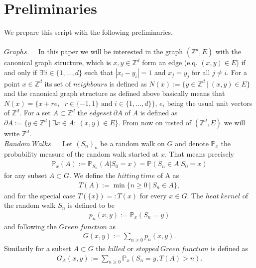 \documentclass[12pt,a4paper]{scrartcl}
\numberwithin{equation}{section}
\numberwithin{equation}{section}%
\theoremstyle{definition}
\theoremstyle{definition}
\begin{document}
\newpage


\section{Preliminaries} \label{prelim}

We prepare this script with the following preliminaries. \\
\\
$\boldsymbol{\mathit{Graphs}}.\quad$ In this paper we will be interested in the graph $(\mathbb{Z}^d, E)$ with the canonical graph structure, which is $x,y\in \mathbb{Z}^d$ form an edge (e.q. $(x,y)\in E$) if and only if $\exists ! i\in \{1,\dots, d\}$ such that $|x_i - y_i| = 1$ and $x_j = y_j$ for all $j\neq i$. For a point $x\in \mathbb{Z}^d$ its set of $\mathit{neighbours}$ is defined as $N(x) := \{y\in \mathbb{Z}^d\ |\ (x,y)\in E\}$ and the canonical graph structure as defined above basically means that $N(x) = \{x+re_i\ |\ r\in \{-1,1\}\text{ and } i\in \{1,\dots, d\}\}$, $e_i$ being the usual unit vectors of $\mathbb{Z}^d$. For a set $A\subset \mathbb{Z}^d$ the $\mathit{edgeset}\ \partial A$ of $A$ is defined as $\partial A := \{y\in \mathbb{Z}^d\ |\ \exists x\in A:\ (x,y)\in E\}$. From now on insted of $(\mathbb{Z}^d, E)$ we will write $\mathbb{Z}^d$. 
\\

\noindent $\boldsymbol{\mathit{Random\ Walks}}.\quad$ Let $(S_n)_n$ be a random walk on $G$ and denote $\mathbb{P}_x$ the probability measure of the random walk started at $x$. That means precisely 
\begin{align*}
	\mathbb{P}_x(A) := \mathbb{P}_{S_n}(A|S_0=x) = \mathbb{P}(S_n\in A|S_0=x)
\end{align*}
for any subset $A\subset G$. We define the $hitting\ time$ of A as 
\begin{align*}
	T(A) := \min \{n\geq 0\ |\ S_n\in A\},
\end{align*}
and for the special case $T(\{x\})=:T(x)$ for every $x\in G$. The $heat\ kernel$ of the random walk $S_n$ is defined to be 
\begin{align*}
	p_n(x,y):=\mathbb{P}_x(S_n=y)
\end{align*}
and following the $Green\ function$ as 
\begin{align*}
	G(x,y) := \sum_{n\geq 0} p_n(x,y).
\end{align*}
Similarily for a subset $A\subset G$ the $killed$ or $stopped\ Green\ function$ is defined as
\begin{align*}
	G_A(x,y) := \sum_{n\geq 0} \mathbb{P}_x(S_n=y, T(A) > n).
\end{align*} 
\end{document}

